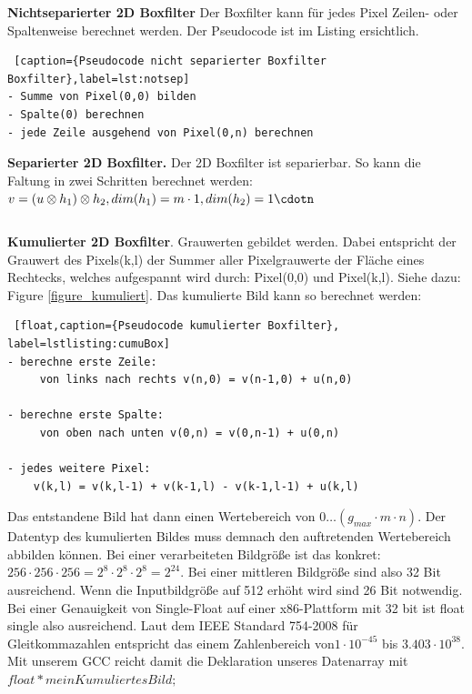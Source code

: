 \documentclass[a4paper,12pt]{article}
\begin{document}
\textbf{Nichtseparierter 2D Boxfilter} 
Der Boxfilter kann für jedes Pixel Zeilen- oder Spaltenweise berechnet
werden. Der Pseudocode ist im Listing ersichtlich.
 
\begin{lstlisting} [caption={Pseudocode nicht separierter Boxfilter
Boxfilter},label=lst:notsep] 
- Summe von Pixel(0,0) bilden
- Spalte(0) berechnen
- jede Zeile ausgehend von Pixel(0,n) berechnen
\end{lstlisting}



\textbf{Separierter 2D Boxfilter.} Der 2D Boxfilter ist separierbar. So kann die
Faltung in zwei Schritten berechnet werden: \\
$v = \left ( u \otimes h_{1} \right ) \otimes h_{2},
dim(h_{1})=m\cdot1,dim(h_{2})=1\cdotn$




\begin{verbatim}
\end{verbatim}

 


\textbf{Kumulierter 2D Boxfilter}.
Grauwerten gebildet werden. Dabei entspricht der Grauwert des Pixels(k,l) der Summer aller
Pixelgrauwerte der Fläche eines Rechtecks, welches aufgespannt wird durch:
Pixel(0,0) und Pixel(k,l). Siehe dazu: Figure \ref{figure_kumuliert}.
Das kumulierte Bild kann so berechnet werden:

\begin{lstlisting} [float,caption={Pseudocode kumulierter Boxfilter},
label=lstlisting:cumuBox]
- berechne erste Zeile:
	 von links nach rechts v(n,0) = v(n-1,0) + u(n,0)
	 
- berechne erste Spalte:
	 von oben nach unten v(0,n) = v(0,n-1) + u(0,n)
	
- jedes weitere Pixel:
	v(k,l) = v(k,l-1) + v(k-1,l) - v(k-1,l-1) + u(k,l)
\end{lstlisting}


Das entstandene Bild hat dann einen Wertebereich von 
$0 \ldots (g_{max} \cdot m \cdot n)$. Der Datentyp des kumulierten Bildes muss
demnach den auftretenden Wertebereich abbilden können. Bei einer verarbeiteten Bildgröße ist
das konkret: $256 \cdot 256 \cdot 256 = 2^{8} \cdot 2^{8} \cdot 2^{8} = 2^{24}$.
Bei einer mittleren Bildgröße sind also 32 Bit ausreichend. Wenn die Inputbildgröße auf 512
erhöht wird sind 26 Bit notwendig. Bei einer Genauigkeit von Single-Float auf
einer x86-Plattform mit 32 bit ist float single also ausreichend. Laut dem IEEE
Standard 754-2008 für Gleitkommazahlen \cite{ieee754} entspricht das einem
Zahlenbereich von$1 \cdot 10^{-45}$ bis $3.403 \cdot 10^{38}$. Mit unserem GCC
reicht damit die Deklaration unseres Datenarray mit\\
$float* meinKumuliertesBild;$\\
\end{document}
